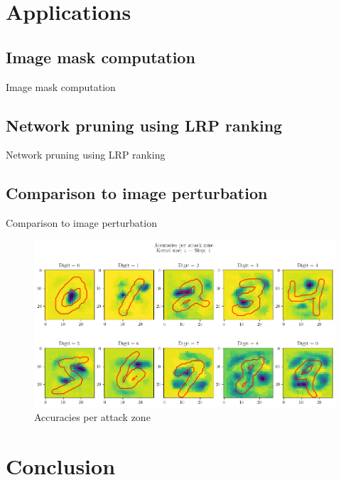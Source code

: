 \documentclass[aspectratio=169]{beamer}
\theoremstyle{definition}
\begin{document}

\section{Applications}
\subsection{Image mask computation}
\begin{frame}{Image mask computation}
    
\end{frame}

\subsection{Network pruning using LRP ranking}
\begin{frame}{Network pruning using LRP ranking}
    
\end{frame}

\subsection{Comparison to image perturbation}
\begin{frame}{Comparison to image perturbation}
    \begin{figure}
        \includegraphics[width=.7\textwidth]{attacks.png}
        \caption{Accuracies per attack zone}
    \end{figure}
\end{frame}

\section{Conclusion}
\begin{frame}
    \nocite{*}
    \printbibliography
\end{frame}
\end{document}
